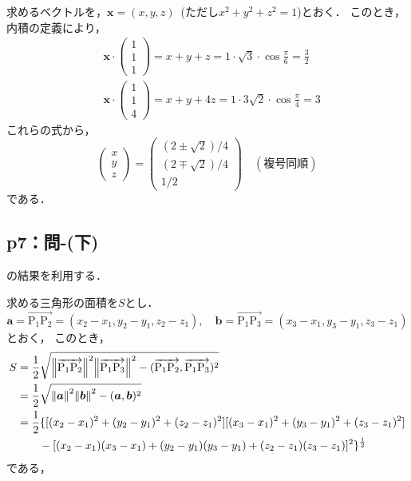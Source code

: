 \documentclass[uplatex,dvipdfmx,a4paper,11pt,fleqn]{jsarticle}
\begin{document}
\begin{tleftbar}
    求めるベクトルを，$\bm{x}=(x,y,z)$~(ただし$x^2+y^2 +z^2=1$)とおく．
    このとき，内積の定義により，
    \begin{align*}
        &\bm{x} \cdot 
        \begin{pmatrix}
                1 \\
                1 \\
                1
            \end{pmatrix}
        =x+y+z= 1 \cdot \sqrt{3} \cdot \cos \frac{\pi}{6} =\frac{3}{2} \\
        &\bm{x} \cdot 
            \begin{pmatrix}
                1 \\
                1 \\
                4
            \end{pmatrix}
        =x+y+4z= 1 \cdot 3\sqrt{2} \cdot \cos \frac{\pi}{4} =3
        \end{align*}
        これらの式から，
        \begin{equation*}
            \begin{pmatrix}
            x \\
            y \\
            z  
    \end{pmatrix}
    =
    \begin{pmatrix}
        (2 \pm \sqrt{2})/4 \\
        (2 \mp \sqrt{2})/4 \\
        1/2
    \end{pmatrix}
         \quad (\text{複号同順})
    \end{equation*}
        である．
    \end{tleftbar}
    \subsection*{p7：問-(下)}
\begin{tleftbar}
	[1.4]の結果を利用する．

	求める三角形の面積を$S$とし．
    \[
    \bm{a}=\overrightarrow{\mathrm{P_1 P_2}}=(x_2-x_1,y_2-y_1,z_2-z_1),\quad \bm{b}=\overrightarrow{\mathrm{P_1 P_3}}=(x_3-x_1,y_3-y_1,z_3-z_1)
    \]
    とおく，
	このとき，
	\begin{align*}
		S & = \frac{1}{2} \sqrt{\norm{\overrightarrow{\mathrm{P_1 P_2}}}^2 \norm{\overrightarrow{\mathrm{P_1 P_3}}}^2 - (\overrightarrow{\mathrm{P_1 P_2}}, \overrightarrow{\mathrm{P_1 P_3}})^2} \\
		  & = \frac{1}{2} \sqrt{\norm{\bm{a}}^2 \norm{\bm{b}}^2 - (\bm{a},\bm{b})^2 } \\
		  & = \frac{1}{2} \{ \lbrack (x_2 - x_1)^2+(y_2-y_1)^2+ (z_2 - z_1)^2 \rbrack \lbrack (x_3 - x_1)^2+(y_3-y_1)^2+ (z_3 - z_1)^2 \rbrack\\
		  & \qquad - \lbrack (x_2-x_1)(x_3-x_1)+(y_2 -y_1)(y_3-y_1)+(z_2-z_1)(z_3-z_1)\rbrack ^2\}^{\frac{1}{2}}
	\end{align*}
	である，
\end{tleftbar}
	
\end{document}
